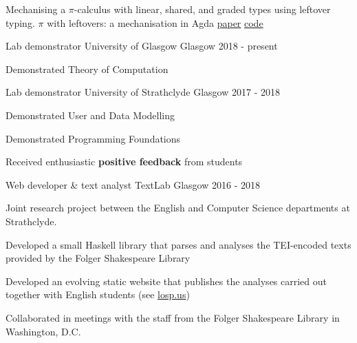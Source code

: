 \documentclass[11pt, a4paper]{awesome-cv}
\begin{document}

\begin{cventries}
  \cventry
  {Mechanising a $\pi$-calculus with linear, shared, and graded types using leftover typing.}
  {$\pi$ with leftovers: a mechanisation in Agda}
  {\href{https://arxiv.org/abs/2005.05902}{paper}}
  {\href{https://github.com/umazalakain/typing-with-leftovers}{code}}
  {}
\end{cventries}


\begin{cventries}

    \cventry
      {Lab demonstrator} %
      {University of Glasgow} %
      {Glasgow} %
      {2018 - present} %
      {
        \begin{cvitems} %
          \item {Demonstrated Theory of Computation}
        \end{cvitems}
      }

    \cventry
      {Lab demonstrator} %
      {University of Strathclyde} %
      {Glasgow} %
      {2017 - 2018} %
      {
        \begin{cvitems} %
          \item {Demonstrated User and Data Modelling}
          \item {Demonstrated Programming Foundations}
          \item {Received enthusiastic \textbf{positive feedback} from students}
        \end{cvitems}
      }

    \cventry
      {Web developer \& text analyst} %
      {TextLab}
      {Glasgow} %
      {2016 - 2018} %
      {
        Joint research project between the English and Computer Science
        departments at Strathclyde.\vspace{1.1\baselineskip}
        \begin{cvitems} %
          \item {Developed a small Haskell library that parses and analyses the
              TEI-encoded texts provided by the Folger Shakespeare Library}
          \item {Developed an evolving static website that publishes the
              analyses carried out together with English students (see
                \url{losp.us})}
          \item {Collaborated in meetings with the staff from the Folger
              Shakespeare Library in Washington, D.C.}
        \end{cvitems}
      }


\end{cventries}
\end{document}
